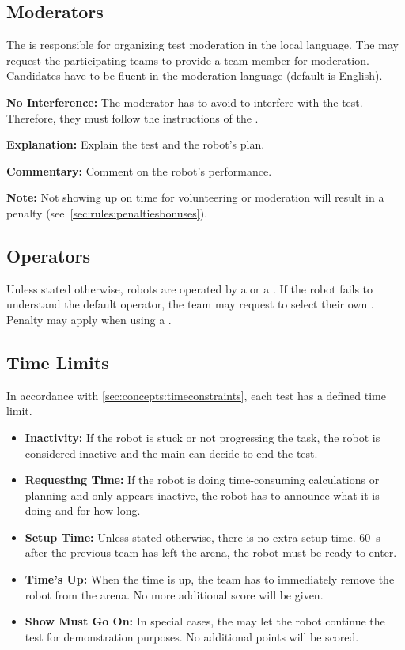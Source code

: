 \subsection{Moderators}
\label{sec:rules:moderators}
The  is responsible for organizing test moderation in the local language. The  may request the participating teams to provide a team member for moderation. Candidates have to be fluent in the moderation language (default is English).
\begin{compactitem}
	\item \textbf{No Interference:} The moderator has to avoid to interfere with the test. Therefore, they must follow the instructions of the \Referees{}.
	\item \textbf{Explanation:} Explain the test and the robot's plan.
	\item \textbf{Commentary:} Comment on the robot's performance.
\end{compactitem}

\noindent \textbf{Note:} Not showing up on time for volunteering or moderation will result in a penalty (see~\ref{sec:rules:penaltiesbonuses}).

\subsection{Operators}
\label{sec:rules:operators}
Unless stated otherwise, robots are operated by a \Referee{} or a \Volunteer{}. If the robot fails to understand the default operator, the team may request to select their own \CustomOperator{}. Penalty may apply when using a \CustomOperator{}.


\subsection{Time Limits}
\label{rule:time_limits}
In accordance with \ref{sec:concepts:timeconstraints}, each test has a defined time limit.
\begin{itemize}
	\item \textbf{Inactivity:} If the robot is stuck or not progressing the task, the robot is considered inactive and the main \Referee{} can decide to end the test. 

	\item \textbf{Requesting Time:} If the robot is doing time-consuming calculations or planning and only appears inactive, the robot has to announce what it is doing and for how long.

	\item \textbf{Setup Time:} Unless stated otherwise, there is no extra setup time. \SI{60}{\second} after the previous team has left the arena, the robot must be ready to enter. 

	\item \textbf{Time's Up:} When the time is up, the team has to immediately remove the robot from the arena.
	No more additional score will be given.

	\item \textbf{Show Must Go On:} In special cases, the \Referee{} may let the robot continue the test for demonstration purposes. No additional points will be scored.
\end{itemize}

